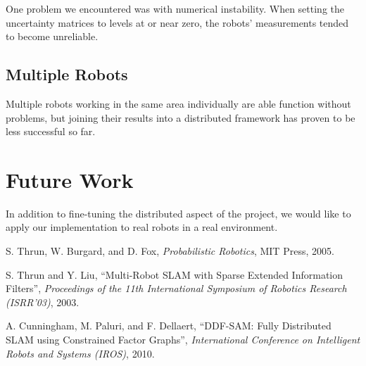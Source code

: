 \documentclass[prodmode,acmtecs]{acmsmall} %
\begin{document}
One problem we encountered was with numerical instability.  When setting the uncertainty matrices to levels at or near zero, the robots' measurements tended to become unreliable.  

\subsection{Multiple Robots}

Multiple robots working in the same area individually are able function without problems, but joining their results into a distributed framework has proven to be less successful so far.

\section{Future Work}

In addition to fine-tuning the distributed aspect of the project, we would like to apply our implementation to real robots in a real environment.

\begin{thebibliography}{12}
        S. Thrun, W. Burgard, and D. Fox, \emph{Probabilistic Robotics}, MIT Press, 2005.

        S. Thrun and Y. Liu, ``Multi-Robot SLAM with Sparse Extended Information Filters'', \emph{Proceedings of the 11th International Symposium of Robotics Research (ISRR'03)}, 2003.

        A. Cunningham, M. Paluri, and F. Dellaert, ``DDF-SAM: Fully Distributed SLAM using Constrained Factor Graphs'', \emph{International Conference on Intelligent Robots and Systems (IROS)}, 2010.
\end{thebibliography}
\end{document}
